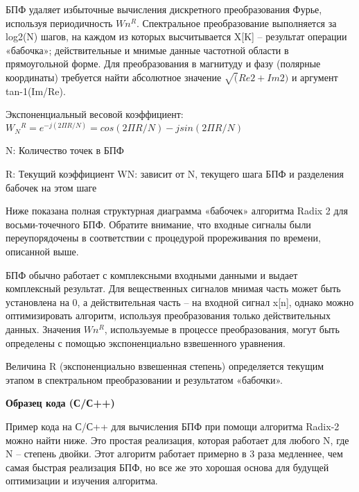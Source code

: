 \newpage
{}

\vspace{\baselineskip}
БПФ удаляет избыточные вычисления дискретного преобразования Фурье, используя периодичность $Wn^R$. Спектральное преобразование выполняется за log2(N) шагов, на каждом из которых высчитывается X[K] – результат операции «бабочка»; действительные и мнимые данные частотной области в прямоугольной форме. Для преобразования в магнитуду и фазу (полярные координаты) требуется найти абсолютное значение $\sqrt(Re2 + Im2)$ и аргумент tan-1(Im/Re).

\vspace{\baselineskip}
Экспоненциальный весовой коэффициент: $W_N{}^R{} = e^{-j(2 \Pi R/N)} = cos(2 \Pi R/N) - jsin(2 \Pi R/N)$

\vspace{\baselineskip}
N: Количество точек в БПФ

\vspace{\baselineskip}
R: Текущий коэффициент WN: зависит от N, текущего шага БПФ и разделения бабочек на этом шаге

\vspace{\baselineskip}
Ниже показана полная структурная диаграмма «бабочек» алгоритма Radix 2 для восьми-точечного БПФ. Обратите внимание, что входные сигналы были переупорядочены в соответствии с процедурой прореживания по времени, описанной выше.

\newpage
{}

БПФ обычно работает с комплексными входными данными и выдает комплексный результат. Для вещественных сигналов мнимая часть может быть установлена на 0, а действительная часть – на входной сигнал x[n], однако можно оптимизировать алгоритм, используя преобразования только действительных данных. Значения $Wn^R$, используемые в процессе преобразования, могут быть определены с помощью экспоненциально взвешенного уравнения.

\vspace{\baselineskip}
Величина R (экспоненциально взвешенная степень) определяется текущим этапом в спектральном преобразовании и результатом «бабочки».

\vspace{\baselineskip}
\textbf{Образец кода (С/С++)}

\vspace{\baselineskip}
Пример кода на С/С++ для вычисления БПФ при помощи алгоритма Radix-2 можно найти ниже. Это простая реализация, которая работает для любого N, где N – степень двойки. Этот алгоритм работает примерно в 3 раза медленнее, чем самая быстрая реализация БПФ, но все же это хорошая основа для будущей оптимизации и изучения алгоритма.

